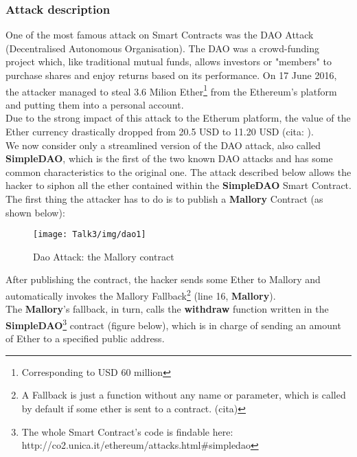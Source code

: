 \subsubsection{Attack description}
One of the most famous attack on Smart Contracts was the DAO Attack (Decentralised Autonomous Organisation).
The DAO was a crowd-funding project which, like traditional mutual funds, allows investors or "members" to purchase shares and enjoy returns based on its performance.
On 17 June 2016, the attacker managed to steal 3.6 Milion Ether\footnote{Corresponding to USD 60 million} from the Ethereum's platform and putting them into a personal account. \\ %
Due to the strong impact of this attack to the Etherum platform, the value of the Ether currency drastically dropped from 20.5 USD to 11.20 USD (cita: %
). \\
We now consider only a streamlined version of the DAO attack, also called \textbf{SimpleDAO}, which is the first of the two known DAO attacks and has some common characteristics to the original one. The attack described below allows the hacker to siphon all the ether contained within the \textbf{SimpleDAO} Smart Contract.\cite{paper2} \\
The first thing the attacker has to do is to publish a \textbf{Mallory} Contract (as shown below): 
\begin{figure}[H]
\begin{center}
\texttt{[image: Talk3/img/dao1]}
\end{center}
\caption{Dao Attack: the Mallory contract}
\label{label}
\end{figure}
After publishing the contract, the hacker sends some Ether to Mallory and automatically invokes the Mallory Fallback\footnote{A Fallback is just a function without any name or parameter, which is called by default if some ether is sent to a contract. (cita) } (line 16, \textbf{Mallory}). \\
The \textbf{Mallory}'s fallback, in turn, calls the \textbf{withdraw} function written in the \textbf{SimpleDAO}\footnote{The whole Smart Contract's code is findable here: http://co2.unica.it/ethereum/attacks.html\#simpledao} contract (figure below), which is in charge of sending an amount of Ether to a specified public address. 
